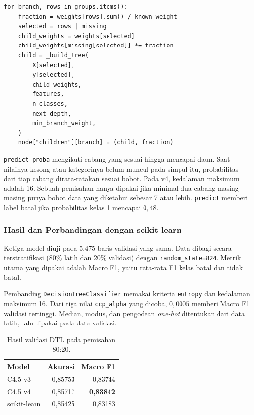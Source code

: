 \noindent\begin{minipage}{\linewidth}
\begin{lstlisting}
for branch, rows in groups.items():
    fraction = weights[rows].sum() / known_weight
    selected = rows | missing
    child_weights = weights[selected]
    child_weights[missing[selected]] *= fraction
    child = _build_tree(
        X[selected],
        y[selected],
        child_weights,
        features,
        n_classes,
        next_depth,
        min_branch_weight,
    )
    node["children"][branch] = (child, fraction)
\end{lstlisting}
\end{minipage}

\texttt{predict\_proba} mengikuti cabang yang sesuai hingga mencapai daun. Saat nilainya kosong atau kategorinya belum muncul pada simpul itu, probabilitas dari tiap cabang dirata-ratakan sesuai bobot. Pada v4, kedalaman maksimum adalah 16. Sebuah pemisahan hanya dipakai jika minimal dua cabang masing-masing punya bobot data yang diketahui sebesar 7 atau lebih. \texttt{predict} memberi label batal jika probabilitas kelas 1 mencapai $0{,}48$.

\subsubsection{Hasil dan Perbandingan dengan scikit-learn}
Ketiga model diuji pada 5.475 baris validasi yang sama. Data dibagi secara terstratifikasi (80\% latih dan 20\% validasi) dengan \texttt{random\_state=824}. Metrik utama yang dipakai adalah Macro F1, yaitu rata-rata F1 kelas batal dan tidak batal.

Pembanding \texttt{DecisionTreeClassifier} memakai kriteria \texttt{entropy} dan kedalaman maksimum 16. Dari tiga nilai \texttt{ccp\_alpha} yang dicoba, $0{,}0005$ memberi Macro F1 validasi tertinggi. Median, modus, dan pengodean \textit{one-hot} ditentukan dari data latih, lalu dipakai pada data validasi.

\begin{table}[!htbp]
  \centering
  \caption{Hasil validasi DTL pada pemisahan 80:20.}
  \label{tab:dtl-validation}
  \begin{tabular}{@{}lrr@{}}
    \toprule
    Model & Akurasi & Macro F1 \\
    \midrule
    C4.5 v3 & 0,85753 & 0,83744 \\
    C4.5 v4 & 0,85717 & \textbf{0,83842} \\
    scikit-learn & 0,85425 & 0,83183 \\
    \bottomrule
  \end{tabular}
\end{table}

